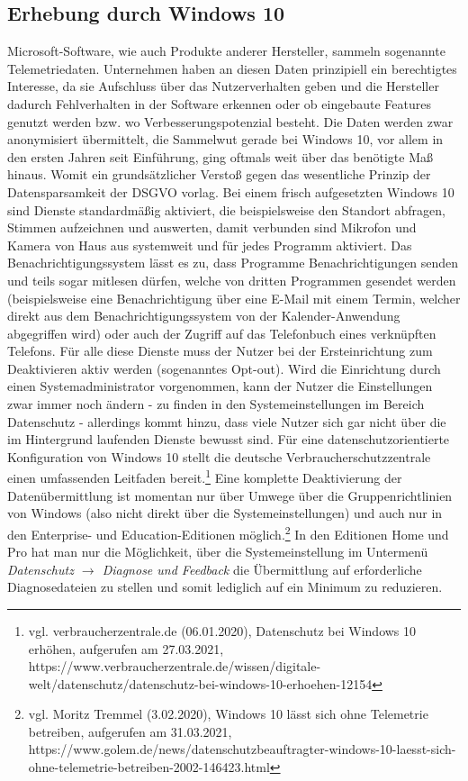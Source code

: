 \subsection{Erhebung durch Windows 10}
Microsoft-Software, wie auch Produkte anderer Hersteller, sammeln sogenannte Telemetriedaten. Unternehmen haben an diesen Daten prinzipiell ein berechtigtes Interesse, da sie Aufschluss über das Nutzerverhalten geben und die Hersteller dadurch Fehlverhalten in der Software erkennen oder ob eingebaute Features genutzt werden bzw. wo Verbesserungspotenzial besteht. Die Daten werden zwar anonymisiert übermittelt, die Sammelwut gerade bei Windows 10, vor allem in den ersten Jahren seit Einführung, ging oftmals weit über das benötigte Maß hinaus. Womit ein grundsätzlicher Verstoß gegen das wesentliche Prinzip der Datensparsamkeit der DSGVO vorlag. Bei einem frisch aufgesetzten Windows 10 sind Dienste standardmäßig aktiviert, die beispielsweise den Standort abfragen, Stimmen aufzeichnen und auswerten, damit verbunden sind Mikrofon und Kamera von Haus aus systemweit und für jedes Programm aktiviert. Das Benachrichtigungssystem lässt es zu, dass Programme Benachrichtigungen senden und teils sogar mitlesen dürfen, welche von dritten Programmen gesendet werden (beispielsweise eine Benachrichtigung über eine E-Mail mit einem Termin, welcher direkt aus dem Benachrichtigungssystem von der Kalender-Anwendung abgegriffen wird) oder auch der Zugriff auf das Telefonbuch eines verknüpften Telefons. Für alle diese Dienste muss der Nutzer bei der Ersteinrichtung zum Deaktivieren aktiv werden (sogenanntes Opt-out). Wird die Einrichtung durch einen Systemadministrator vorgenommen, kann der Nutzer die Einstellungen zwar immer noch ändern - zu finden in den Systemeinstellungen im Bereich \glqq Datenschutz\grqq{} - allerdings kommt hinzu, dass viele Nutzer sich gar nicht über die im Hintergrund laufenden Dienste bewusst sind. Für eine datenschutzorientierte Konfiguration von Windows 10 stellt die deutsche Verbraucherschutzzentrale einen umfassenden Leitfaden bereit.\footnote{vgl. verbraucherzentrale.de (06.01.2020), Datenschutz bei Windows 10 erhöhen, aufgerufen am 27.03.2021, https://www.verbraucherzentrale.de/wissen/digitale-welt/datenschutz/datenschutz-bei-windows-10-erhoehen-12154} Eine komplette Deaktivierung der Datenübermittlung ist momentan nur über Umwege über die Gruppenrichtlinien von Windows (also nicht direkt über die Systemeinstellungen) und auch nur in den Enterprise- und Education-Editionen möglich.\footnote{vgl. Moritz Tremmel (3.02.2020), Windows 10 lässt sich ohne Telemetrie betreiben, aufgerufen am 31.03.2021, https://www.golem.de/news/datenschutzbeauftragter-windows-10-laesst-sich-ohne-telemetrie-betreiben-2002-146423.html} In den Editionen Home und Pro hat man nur die Möglichkeit, über die Systemeinstellung im Untermenü \textit{Datenschutz $\rightarrow$ Diagnose und Feedback} die Übermittlung auf \glqq erforderliche Diagnosedateien\grqq{} zu stellen und somit lediglich auf ein Minimum zu reduzieren.

